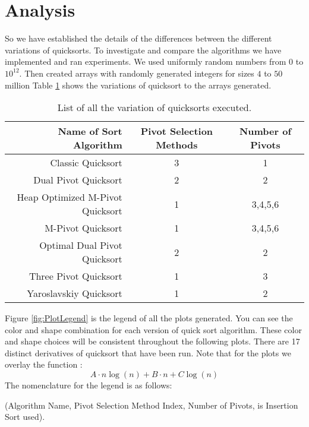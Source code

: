 

\section{Analysis}
	\label{sec:Analysis}
	So we have established the details of the differences between the different variations of quicksorts.
	To investigate and compare the algorithms we have implemented and ran experiments. 
	We used uniformly random numbers from $0$ to $10^{12}$.
	Then created arrays with randomly generated integers for sizes $4$ to $50$ million
	Table \ref{tab:FullSortList} shows the variations of quicksort to the arrays generated.
	\begin{table}
		\begin{center}
			\begin{tabular}{|r|c|c|}
				\hline
				Name of Sort Algorithm           & Pivot Selection Methods & Number of Pivots \\ \hline \hline
				Classic Quicksort                &  3  &  1       \\ \hline
				Dual Pivot Quicksort             &  2  &  2       \\ \hline
				Heap Optimized M-Pivot Quicksort &  1  &  3,4,5,6 \\ \hline
				M-Pivot Quicksort                &  1  &  3,4,5,6 \\ \hline
				Optimal Dual Pivot Quicksort     &  2  &  2       \\ \hline
				Three Pivot Quicksort            &  1  &  3       \\ \hline
				Yaroslavskiy Quicksort           &  1  &  2       \\ \hline
			\end{tabular}
			\caption{List of all the variation of quicksorts executed.}
			\label{tab:FullSortList}
		\end{center}
	\end{table}


	Figure \ref{fig:PlotLegend} is the legend of all the plots generated.
	You can see the color and shape combination for each version of quick sort algorithm. 
	These color and shape choices will be consistent throughout the following plots.
	There are 17 distinct derivatives of quicksort that have been run.
	Note that for the plots we overlay the function :
	\begin{equation}
		A\cdot n\log(n) + B\cdot n + C \log(n)
		\label{eq:FitFunction}
	\end{equation}
	The nomenclature for the legend is as follows: 
	\begin{center}
		(Algorithm Name, Pivot Selection Method Index, Number of Pivots, is Insertion Sort used).
	\end{center}

